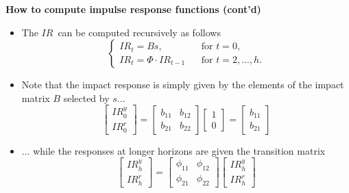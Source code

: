 \begin{frame}
{\textbf{How to compute {impulse response functions (cont'd)}}}

\begin{itemize}
\item The $IR$\ can be computed recursively as follows%
\begin{equation*}
\left\{ 
\begin{array}{ll}
IR_{t}=Bs, & \ \ \ \ \text{for }t=0, \\ 
IR_{t}=\Phi \cdot IR_{t-1} & \ \ \ \ \text{for }t=2,...,h.%
\end{array}%
\right.
\end{equation*}

\item Note that the impact response is simply given by the elements of the
impact matrix $B$ selected by $s$...%
\begin{equation*}
\left[ 
\begin{array}{c}
IR_{0}^{y} \\ 
IR_{0}^{r}%
\end{array}%
\right] =\left[ 
\begin{array}{cc}
b_{11} & b_{12} \\ 
b_{21} & b_{22}%
\end{array}%
\right] \left[ 
\begin{array}{c}
1 \\ 
0%
\end{array}%
\right] =\left[ 
\begin{array}{c}
b_{11} \\ 
b_{21}%
\end{array}%
\right]
\end{equation*}

\item ... while the responses at longer horizons are given the transition
matrix 
\begin{equation*}
\left[ 
\begin{array}{c}
IR_{h}^{y} \\ 
IR_{h}^{r}%
\end{array}%
\right] =%
\begin{bmatrix}
\phi _{11} & \phi _{12} \\ 
\phi _{21} & \phi _{22}%
\end{bmatrix}%
\left[ 
\begin{array}{c}
IR_{h}^{y} \\ 
IR_{h}^{r}%
\end{array}%
\right]
\end{equation*}
\end{itemize}
\end{frame}

